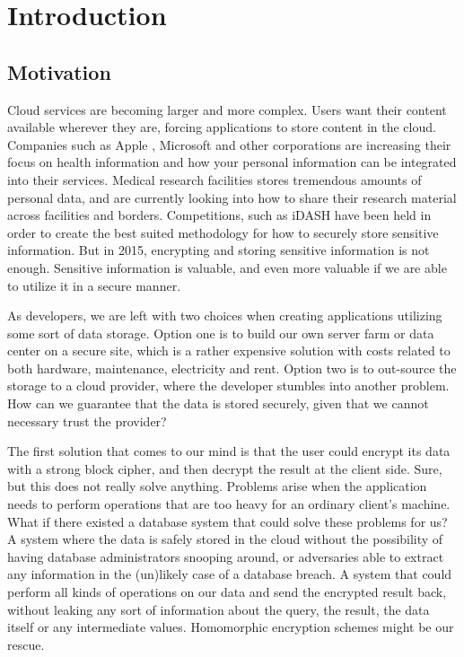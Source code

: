 \chapter{Introduction}
\label{chp:introduction}

\section{Motivation}

Cloud services are becoming larger and more complex. Users want their content available wherever they are, forcing applications to store content in the cloud. Companies such as Apple \cite{apple_health}, Microsoft \cite{microsoft_health} and other corporations are increasing their focus on health information and how your personal information can be integrated into their services. Medical research facilities stores tremendous amounts of personal data, and are currently looking into how to share their research material across facilities and borders. Competitions, such as iDASH \cite{iDASH} have been held in order to create the best suited methodology for how to securely store sensitive information. But in 2015, encrypting and storing sensitive information is not enough. Sensitive information is valuable, and even more valuable if we are able to utilize it in a secure manner. 
 

As developers, we are left with two choices when creating applications utilizing some sort of data storage. Option one is to build our own server farm or data center on a secure site, which is a rather expensive solution with costs related to both hardware, maintenance, electricity and rent. Option two is to out-source the storage to a cloud provider, where the developer stumbles into another problem. How can we guarantee that the data is stored securely, given that we cannot necessary trust the provider?

The first solution that comes to our mind is that the user could encrypt its data with a strong block cipher, and then decrypt the result at the client side. Sure, but this does not really solve anything. Problems arise when the application needs to perform operations that are too heavy for an ordinary client's machine. What if there existed a database system that could solve these problems for us? A system where the data is safely stored in the cloud without the possibility of having database administrators snooping around, or adversaries able to extract any information in the (un)likely case of a database breach. A system that could perform all kinds of operations on our data and send the encrypted result back, without leaking any sort of information about the query, the result, the data itself or any intermediate values. Homomorphic encryption schemes might be our rescue.

